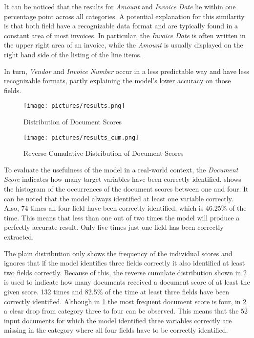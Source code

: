 It can be noticed that the results for \textit{Amount} and \textit{Invoice Date} lie within one percentage point across all categories. A potential explanation for this similarity is that both field have a recognizable data format and are typically found in a constant area of most invoices. In particular, the \textit{Invoice Date} is often written in the upper right area of an invoice, while the \textit{Amount} is usually displayed on the right hand side of the listing of the line items.

In turn, \textit{Vendor} and \textit{Invoice Number} occur in a less predictable way and have less recognizable formats, partly explaining the model's lower accuracy on those fields. 

\begin{figure}[!ht]
    \centering 
    \texttt{[image: pictures/results.png]}
    \caption{Distribution of Document Scores}
    \label{pic:results_1}    %
\end{figure}
\begin{figure}[!ht]
    \centering 
    \texttt{[image: pictures/results\_cum.png]}
    \caption{Reverse Cumulative Distribution of Document Scores}
    \label{pic:results_1_cum}    %
\end{figure}

To evaluate the usefulness of the model in a real-world context, the \textit{Document Score} indicates how many target variables have been correctly identified.  shows the histogram of the occurrences of the document scores between one and four. It can be noted that the model always identified at least one variable correctly. Also, 74 times all four field have been correctly identified, which is 46.25\% of the time. This means that less than one out of two times the model will produce a perfectly accurate result. Only five times just one field has been correctly extracted.

The plain distribution only shows the frequency of the individual scores and ignores that if the model identifies three fields correctly it also identified at least two fields correctly. Because of this, the reverse cumulate distribution shown in \cref{pic:results_1_cum} is used to indicate how many documents received a document score of at least the given score. 132 times and 82.5\% of the time at least three fields have been correctly identified. Although in \cref{pic:results_1} the most frequent document score is four, in \cref{pic:results_1_cum} a clear drop from category three to four can be observed. This means that the 52 input documents for which the model identified three variables correctly are missing in the category where all four fields have to be correctly identified.

